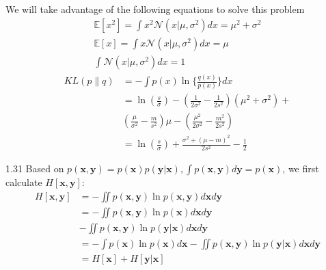\documentclass[5p,sort&compress]{elsarticle}
\begin{document}
We will take advantage of the following equations to solve this problem
\begin{equation}
\begin{aligned}
\mathbb{E}\left[x^{2}\right]=\int x^{2} \mathcal{N}\left(x | \mu, \sigma^{2}\right) d x=\mu^{2}+\sigma^{2} \\
\mathbb{E}[x]= \int x \mathcal{N}\left(x | \mu, \sigma^{2}\right) d x= \mu \\
\int \mathcal{N}\left(x | \mu, \sigma^{2}\right) d x=1
\end{aligned}
\end{equation}
\begin{equation}
\begin{aligned} K L(p \| q) &=-\int p(x) \ln \{\frac{q(x)}{p(x)}\} d x \\ &=\ln \left(\frac{s}{\sigma}\right)-\left(\frac{1}{2 \sigma^{2}}-\frac{1}{2 s^{2}}\right)(\mu^{2}+\sigma^{2})+ \\ & (\frac{\mu}{\sigma^{2}}-\frac{m}{s^{2}}) \mu-(\frac{\mu^{2}}{2 \sigma^{2}}-\frac{m^{2}}{2 s^{2}}) \\ &=\ln \left(\frac{s}{\sigma}\right)+\frac{\sigma^{2}+(\mu-m)^{2}}{2 s^{2}}-\frac{1}{2} \end{aligned}
\end{equation}

1.31 Based on $p(\mathbf{x}, \mathbf{y})=p(\mathbf{x}) p(\mathbf{y} | \mathbf{x}), \int p(\mathbf{x}, \mathbf{y}) d \mathbf{y}=p(\mathbf{x})$, we first calculate $H[\mathbf{x}, \mathbf{y}]$:
\begin{equation}
\begin{aligned} H[\mathbf{x}, \mathbf{y}] &=-\iint p(\mathbf{x}, \mathbf{y}) \ln p(\mathbf{x}, \mathbf{y}) d \mathbf{x} d \mathbf{y} \\ &=-\iint p(\mathbf{x}, \mathbf{y}) \ln p(\mathbf{x}) d \mathbf{x} d \mathbf{y} \\ &
-\iint p(\mathbf{x}, \mathbf{y}) \ln p(\mathbf{y} | \mathbf{x}) d \mathbf{x} d \mathbf{y} \\ &=-\int p(\mathbf{x}) \ln p(\mathbf{x}) d \mathbf{x}-\iint p(\mathbf{x}, \mathbf{y}) \ln p(\mathbf{y} | \mathbf{x}) d \mathbf{x} d \mathbf{y} \\ &=H[\mathbf{x}]+H[\mathbf{y} | \mathbf{x}] \end{aligned}
\end{equation}
\end{document}
